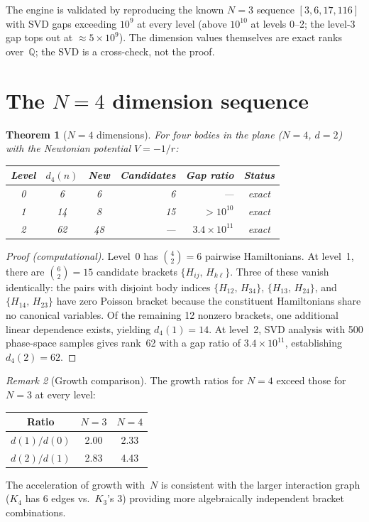 \documentclass[11pt,a4paper]{article}
\newtheorem{theorem}{Theorem}
\theoremstyle{remark}
\newtheorem{remark}[theorem]{Remark}
\newcommand{\pb}[2]{\{#1,\,#2\}}
\newcommand{\Q}{\mathbb{Q}}
\begin{document}
The engine is validated by reproducing the known $N{=}3$
sequence $[3, 6, 17, 116]$ with SVD gaps exceeding
$10^{9}$ at every level (above $10^{10}$ at levels 0--2;
the level-3 gap tops out at $\approx 5 \times 10^9$).  The
dimension values themselves are exact ranks over~$\Q$; the
SVD is a cross-check, not the proof.


\section{The $N{=}4$ dimension sequence}
\label{sec:n4}

\begin{theorem}[$N{=}4$ dimensions]
\label{thm:n4}
For four bodies in the plane ($N{=}4$, $d{=}2$) with
the Newtonian potential $V = -1/r$:
\begin{center}
\begin{tabular}{@{}cccrrc@{}}
\toprule
Level & $d_4(n)$ & New & Candidates
  & Gap ratio & Status \\
\midrule
0 & 6  & 6  & 6  & ---
  & exact \\
1 & 14 & 8  & 15 & $> 10^{10}$
  & exact \\
2 & 62 & 48 & ---
  & $3.4 \times 10^{11}$ & exact \\
\bottomrule
\end{tabular}
\end{center}
\end{theorem}

\begin{proof}[Proof (computational)]
Level~0 has $\binom{4}{2} = 6$ pairwise Hamiltonians.
At level~1, there are $\binom{6}{2} = 15$ candidate
brackets $\pb{H_{ij}}{H_{k\ell}}$.  Three of these
vanish identically: the pairs with disjoint body indices
$\pb{H_{12}}{H_{34}}$, $\pb{H_{13}}{H_{24}}$, and
$\pb{H_{14}}{H_{23}}$ have zero Poisson bracket because
the constituent Hamiltonians share no canonical
variables.  Of the remaining 12 nonzero brackets, one
additional linear dependence exists, yielding
$d_4(1) = 14$.  At level~2, SVD analysis with 500
phase-space samples gives rank~62 with a gap ratio of
$3.4 \times 10^{11}$, establishing $d_4(2) = 62$.
\end{proof}

\begin{remark}[Growth comparison]
The growth ratios for $N{=}4$ exceed those for $N{=}3$
at every level:
\begin{center}
\begin{tabular}{@{}ccc@{}}
\toprule
Ratio & $N{=}3$ & $N{=}4$ \\
\midrule
$d(1)/d(0)$ & 2.00 & 2.33 \\
$d(2)/d(1)$ & 2.83 & 4.43 \\
\bottomrule
\end{tabular}
\end{center}
The acceleration of growth with~$N$ is consistent with
the larger interaction graph ($K_4$ has 6 edges vs.\
$K_3$'s 3) providing more algebraically independent
bracket combinations.
\end{remark}
\end{document}
